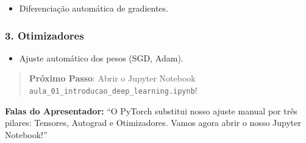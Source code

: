 \documentclass[
  letterpaper,
  DIV=11,
  numbers=noendperiod]{scrartcl}
\providecommand{\tightlist}{%
  \setlength{\itemsep}{0pt}\setlength{\parskip}{0pt}}
\begin{document}
\begin{itemize}
\tightlist
\item
  Diferenciação automática de gradientes.
\end{itemize}

\subsubsection{3. Otimizadores}\label{otimizadores}

\begin{itemize}
\tightlist
\item
  Ajuste automático dos pesos (SGD, Adam).
\end{itemize}

\begin{quote}
\textbf{Próximo Passo}: Abrir o Jupyter Notebook
\texttt{aula\_01\_introducao\_deep\_learning.ipynb}!
\end{quote}

\textbf{Falas do Apresentador:} ``O PyTorch substitui nosso ajuste
manual por três pilares: Tensores, Autograd e Otimizadores. Vamos agora
abrir o nosso Jupyter Notebook!''
\end{document}

